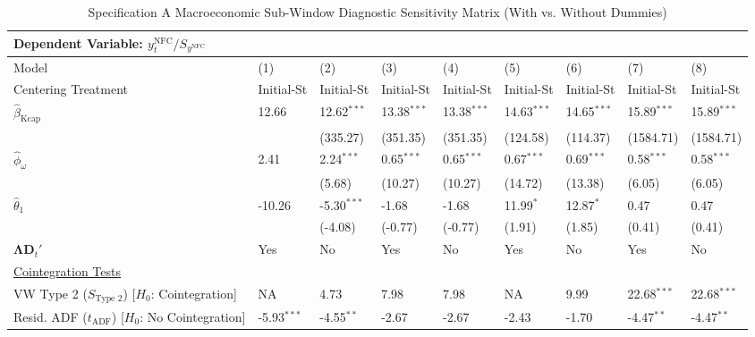 \begin{landscape}
\begin{table}[H]
\centering
\caption{Specification A Macroeconomic Sub-Window Diagnostic Sensitivity Matrix (With vs. Without Dummies)}
\label{tab:specA_diagnostics}
\small
\begin{tabular}{p{5.2cm}p{1.5cm}p{1.5cm}p{1.5cm}p{1.5cm}p{1.5cm}p{1.5cm}p{1.5cm}p{1.5cm}}
\toprule
\multicolumn{9}{l}{\textbf{Dependent Variable: $y_t^{\text{NFC}} / S_{y^{\text{NFC}}}$}} \\
\midrule
Model & (1) & (2) & (3) & (4) & (5) & (6) & (7) & (8)  \\
Centering Treatment & Initial-St & Initial-St & Initial-St & Initial-St & Initial-St & Initial-St & Initial-St & Initial-St  \\
\midrule
$\hat{\beta}_{\text{Kcap}}$ & 12.66 & 12.62$^{***}$ & 13.38$^{***}$ & 13.38$^{***}$ & 14.63$^{***}$ & 14.65$^{***}$ & 15.89$^{***}$ & 15.89$^{***}$  \\
 &  & {\scriptsize (335.27)} & {\scriptsize (351.35)} & {\scriptsize (351.35)} & {\scriptsize (124.58)} & {\scriptsize (114.37)} & {\scriptsize (1584.71)} & {\scriptsize (1584.71)}  \\
$\hat{\phi}_{\omega}$ & 2.41 & 2.24$^{***}$ & 0.65$^{***}$ & 0.65$^{***}$ & 0.67$^{***}$ & 0.69$^{***}$ & 0.58$^{***}$ & 0.58$^{***}$  \\
 &  & {\scriptsize (5.68)} & {\scriptsize (10.27)} & {\scriptsize (10.27)} & {\scriptsize (14.72)} & {\scriptsize (13.38)} & {\scriptsize (6.05)} & {\scriptsize (6.05)}  \\
$\hat{\theta}_{1}$ & -10.26 & -5.30$^{***}$ & -1.68 & -1.68 & 11.99$^{*}$ & 12.87$^{*}$ & 0.47 & 0.47  \\
 &  & {\scriptsize (-4.08)} & {\scriptsize (-0.77)} & {\scriptsize (-0.77)} & {\scriptsize (1.91)} & {\scriptsize (1.85)} & {\scriptsize (0.41)} & {\scriptsize (0.41)}  \\
$\boldsymbol{\Lambda} \mathbf{D}_t'$ & Yes & No & Yes & No & Yes & No & Yes & No  \\
\midrule
\multicolumn{9}{l}{\underline{Cointegration Tests}} \\
\makecell[l]{VW Type 2 ($S_{\text{Type 2}}$) \\ {\scriptsize [$H_0$: Cointegration]}} & NA & 4.73 & 7.98 & 7.98 & NA & 9.99 & 22.68$^{***}$ & 22.68$^{***}$  \\
\makecell[l]{Resid. ADF ($t_{\text{ADF}}$) \\ {\scriptsize [$H_0$: No Cointegration]}} & -5.93$^{***}$ & -4.55$^{**}$ & -2.67 & -2.67 & -2.43 & -1.70 & -4.47$^{**}$ & -4.47$^{**}$  \\

\end{tabular}
\end{table}
\end{landscape}
